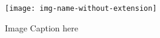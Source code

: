 \begin{figure}[H]
  \centering
  \texttt{[image: img-name-without-extension]}
  \caption{Image Caption here}
  \label{fig:label}
\end{figure}